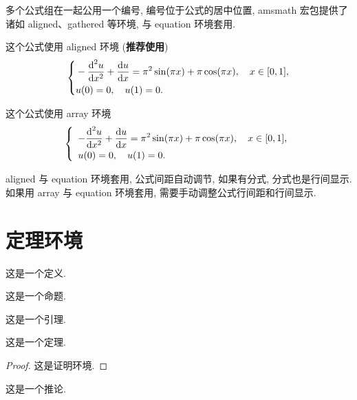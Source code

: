 多个公式组在一起公用一个编号, 编号位于公式的居中位置, amsmath 宏包提供了诸如 aligned、gathered 等环境, 与 equation 环境套用.

这个公式使用 aligned 环境 (\textbf{推荐使用})
\begin{equation}\label{eq:alignedEq}
\left\{\begin{aligned}
  &-\frac{{\mathop{}\!\mathrm{d}}^{2} u}{\mathop{}\!\mathrm{d} x^{2}}+\frac{\mathop{}\!\mathrm{d} u}{\mathop{}\!\mathrm{d} x}=\pi^{2} \sin (\pi x)+\pi \cos (\pi x),\quad x \in [0,1], \\
  &u(0)=0,\quad u(1)=0.
\end{aligned} \right.
\end{equation}

这个公式使用 array 环境
\begin{equation}\label{eq:arrayEq}
\left\{\begin{array}{l}
\displaystyle
-\frac{{\mathop{}\!\mathrm{d}}^{2} u}{\mathop{}\!\mathrm{d} x^{2}}+\frac{\mathop{}\!\mathrm{d} u}{\mathop{}\!\mathrm{d} x}=\pi^{2} \sin (\pi x)+\pi \cos (\pi x),\quad x \in [0,1], \\[6pt]
u(0)=0,\quad u(1)=0.
\end{array} \right.
\end{equation}

aligned 与 equation 环境套用, 公式间距自动调节, 如果有分式, 分式也是行间显示. 如果用 array 与 equation 环境套用, 需要手动调整公式行间距和行间显示.


\section{定理环境}

\begin{definition}\label{def:foo}
这是一个定义.
\end{definition}

\begin{proposition}\label{prop:foo}
这是一个命题.
\end{proposition}

\begin{lemma}[Lemma]\label{lmm:foo}
这是一个引理.
\end{lemma}

\begin{theorem}[Theorem]\label{thm:foo}
这是一个定理.
\end{theorem}

\begin{proof}
这是证明环境.
\end{proof}

\begin{corollary}\label{cor:foo}
这是一个推论.
\end{corollary}

